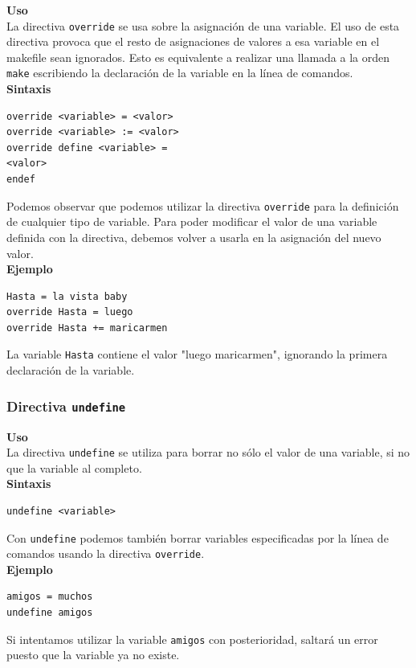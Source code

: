 \documentclass[11pt,twoside,titlepage,a4paper]{article}
\theoremstyle{definition}
\theoremstyle{plain_rojo}
\theoremstyle{remark}
\begin{document}
\textbf{\textcolor{burdeos}{Uso}}
\\La directiva \texttt{override} se usa sobre la asignación de una variable. 
El uso de esta directiva provoca que el resto de asignaciones de valores a 
esa variable en el makefile sean ignorados. Esto es equivalente a realizar 
una llamada a la orden \texttt{make} escribiendo la declaración de la 
variable en la línea de comandos.
\\

\textbf{\textcolor{burdeos}{Sintaxis}}
\begin{lstlisting}
override <variable> = <valor>
override <variable> := <valor>
override define <variable> =
<valor>
endef
\end{lstlisting}
Podemos observar que podemos utilizar la directiva \texttt{override} para la
definición de cualquier tipo de variable. Para poder modificar el valor de 
una variable definida con la directiva, debemos volver a usarla en la 
asignación del nuevo valor.
\\

\textbf{\textcolor{burdeos}{Ejemplo}}
\begin{lstlisting}
Hasta = la vista baby 
override Hasta = luego
override Hasta += maricarmen
\end{lstlisting}
La variable \texttt{Hasta} contiene el valor "luego maricarmen", ignorando 
la primera declaración de la variable.

\subsubsection{Directiva \texttt{undefine}}

\textbf{\textcolor{burdeos}{Uso}}
\\La directiva \texttt{undefine} se utiliza para borrar no sólo el valor de
una variable, si no que la variable al completo.
\\

\textbf{\textcolor{burdeos}{Sintaxis}}
\begin{lstlisting}
undefine <variable>
\end{lstlisting}
Con \texttt{undefine} podemos también borrar variables especificadas por la 
línea de comandos usando la directiva \texttt{override}.
\\

\textbf{\textcolor{burdeos}{Ejemplo}}
\begin{lstlisting}
amigos = muchos
undefine amigos
\end{lstlisting}
Si intentamos utilizar la variable \texttt{amigos} con posterioridad, saltará
un error puesto que la variable ya no existe.
\end{document}
